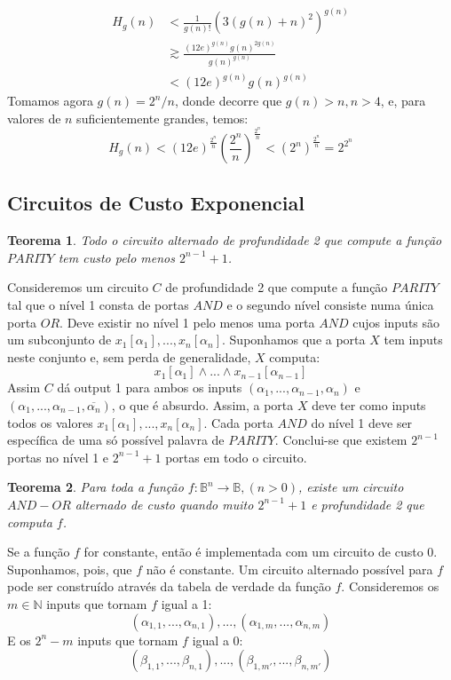 \documentclass[10pt,a4paper]{report}
\newtheorem{theorem}{Teorema}
\begin{document}
\begin{align}
H_g(n) &< \frac{1}{g(n)!}(3(g(n)+n)^2)^{g(n)}\\
&\gtrsim \frac{(12e)^{g(n)}g(n)^{2g(n)}}{g(n)^{g(n)}}\\
&< (12e)^{g(n)}g(n)^{g(n)}
\end{align}
Tomamos agora $g(n) = 2^n/n$, donde decorre que $g(n) > n, n > 4$, e, para valores de $n$ suficientemente grandes, temos:
$$
H_g(n) < (12e)^\frac{2^n}{n} \left(\frac{2^n}{n}\right)^{\frac{2^n}{n}} < (2^n)^{\frac{2^n}{n}} = 2^{2^n}
$$
\subsection{Circuitos de Custo Exponencial}
\begin{theorem}
Todo o circuito alternado de profundidade 2 que compute a função $PARITY$ tem custo pelo menos $2^{n-1} + 1$.
\end{theorem}
Consideremos um circuito $C$ de profundidade 2 que compute a função $PARITY$ tal que o nível 1 consta de portas $AND$ e o segundo nível consiste numa única porta $OR$. Deve existir no nível 1 pelo menos uma porta $AND$ cujos inputs são um subconjunto de $x_1[\alpha_1], ..., x_n[\alpha_n]$. Suponhamos que a porta $X$ tem inputs neste conjunto e, sem perda de generalidade, $X$ computa:
$$
x_1[\alpha_1] \land ... \land x_{n-1}[\alpha_{n-1}]
$$
Assim $C$ dá output 1 para ambos os inputs $(\alpha_1, ..., \alpha_{n-1}, \alpha_n)$ e $(\alpha_1, ..., \alpha_{n-1}, \overline{\alpha_n})$, o que é absurdo. Assim, a porta $X$ deve ter como inputs todos os valores $x_1[\alpha_1], ..., x_n[\alpha_n]$. Cada porta $AND$ do nível 1 deve ser específica de uma só possível palavra de $PARITY$. Conclui-se que existem $2^{n-1}$ portas no nível 1 e $2^{n-1} + 1$ portas em todo o circuito.
\begin{theorem}
Para toda a função $f: \mathbb{B}^n \rightarrow \mathbb{B}, (n > 0)$, existe um circuito $AND-OR$ alternado de custo quando muito $2^{n-1} + 1$ e profundidade 2 que computa $f$.
\end{theorem}
Se a função $f$ for constante, então é implementada com um circuito de custo 0. Suponhamos, pois, que $f$ não é constante. Um circuito alternado possível para $f$ pode ser construído através da tabela de verdade da função $f$. Consideremos os $m \in \mathbb{N}$ inputs que tornam $f$ igual a 1:
$$
(\alpha_{1,1}, ..., \alpha_{n,1}), ..., (\alpha_{1,m}, ..., \alpha_{n,m})
$$
E os $2^n - m$ inputs que tornam $f$ igual a 0:
$$
(\beta_{1,1}, ..., \beta_{n,1}), ..., (\beta_{1,m'}, ..., \beta_{n,m'})
$$
\end{document}
